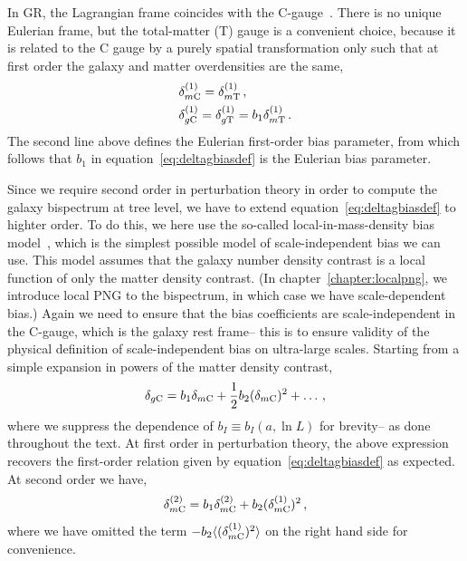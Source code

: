 In GR, the Lagrangian frame coincides with the C-gauge~\cite{Villa:2015ppa,Bertacca:2015mca}. There is no unique Eulerian frame, but the total-matter (T) gauge is a convenient choice, because it is related to the C gauge by a purely spatial transformation only such that at first order the galaxy and matter overdensities are the same,~\cite{Bertacca:2015mca}
\begin{align}\label{eq:deltaFOCgtoTg}
	&\delta^{(1)}_{m\mathrm{C}} = \delta^{(1)}_{m\mathrm{T}}\,,\\
	&\delta^{(1)}_{g\mathrm{C}} = \delta^{(1)}_{g\mathrm{T}} = b_1 \delta^{(1)}_{m\mathrm{T}}\,.
\end{align}
The second line above defines the Eulerian first-order bias parameter, from which follows that $b_1$ in equation~\eqref{eq:deltagbiasdef} is the Eulerian bias parameter.

Since we require second order in perturbation theory in order to compute the galaxy bispectrum at tree level, we have to extend equation~\eqref{eq:deltagbiasdef} to highter order. To do this, we here use the so-called local-in-mass-density bias model~\cite{Desjacques:2016bnm}, which is the simplest possible model of scale-independent bias we can use. This model assumes that the galaxy number density contrast is a local function of only the matter density contrast. (In chapter~\ref{chapter:localpng}, we introduce local PNG to the bispectrum, in which case we have scale-dependent bias.) Again we need to ensure that the bias coefficients are scale-independent in the C-gauge, which is the galaxy rest frame-- this is to ensure validity of the physical definition of scale-independent bias on ultra-large scales. Starting from a simple expansion in powers of the matter density contrast,
\begin{equation}
	\delta_{g\mathrm{C}} = b_1 \delta_{m\mathrm{C}} + \frac{1}{2} b_2 (\delta_{m\mathrm{C}})^2 + \ldots\,,
\end{equation}
where we suppress the dependence of $b_I \equiv b_I(a,\ln L)$ for brevity-- as done throughout the text. At first order in perturbation theory, the above expression recovers the first-order relation given by equation~\eqref{eq:deltagbiasdef} as expected. At second order we have, 
\begin{equation}\label{eq:biasCgauge}
	\delta^{(2)}_{m\mathrm{C}} = b_1 \delta^{(2)}_{m\mathrm{C}} + b_2 (\delta^{(1)}_{m\mathrm{C}})^2\,,
\end{equation}
where we have omitted the term $- b_2 \langle (\delta^{(1)}_{m\mathrm{C}})^2 \rangle$ on the right hand side for convenience.


